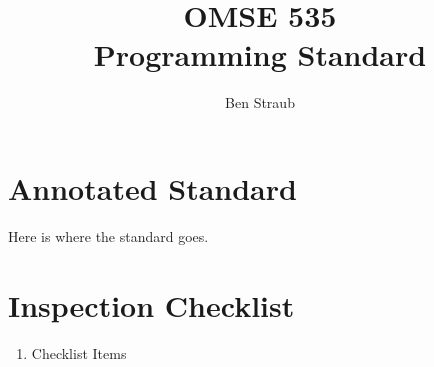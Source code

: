 \documentclass[11pt]{article}
\begin{document}
\title{OMSE 535 \\ Programming Standard}
\author{Ben Straub}
\maketitle



\section{Annotated Standard}

Here is where the standard goes.




\clearpage
\section{Inspection Checklist}

\begin{enumerate}[\ensuremath{\square}]
  \item Checklist Items
\end{enumerate}
\end{document}

